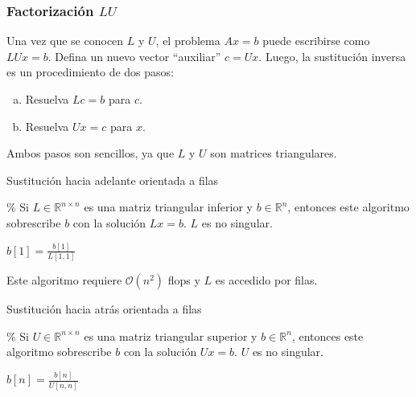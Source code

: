 \subsubsection{Factorización $LU$}

Una vez que se conocen $L$ y $U$, el problema $Ax=b$ puede escribirse
como $LUx=b$.
Defina un nuevo vector ``auxiliar'' $c=Ux$.
Luego, la sustitución inversa es un procedimiento de dos pasos:
\begin{enumerate}[(a)]
    \item

          Resuelva $Lc=b$ para $c$.

    \item

          Resuelva $Ux=c$ para $x$.
\end{enumerate}
Ambos pasos son sencillos, ya que $L$ y $U$ son matrices
triangulares.

\begin{algorithm}[H]
    \caption{Sustitución hacia adelante orientada a filas}
    \% Si $L\in\mathbb{R}^{n\times n}$ es una matriz triangular
    inferior y $b\in\mathbb{R}^{n}$, entonces este algoritmo
    sobrescribe $b$ con la solución $Lx=b$. $L$ es no singular.

    $b\left[1\right]=\frac{b\left[1\right]}{L\left[1,1\right]}$

\end{algorithm}

Este algoritmo requiere $\mathcal{O}\left(n^{2}\right)$ flops y $L$
es accedido por filas.

\begin{algorithm}[H]
    \caption{Sustitución hacia atrás orientada a filas}
    \% Si $U\in\mathbb{R}^{n\times n}$ es una matriz triangular
    superior y $b\in\mathbb{R}^{n}$, entonces este algoritmo
    sobrescribe $b$ con la solución $Ux=b$.
    $U$ es no singular.

    $b\left[n\right]=\frac{b\left[n\right]}{U\left[n,n\right]}$

\end{algorithm}


